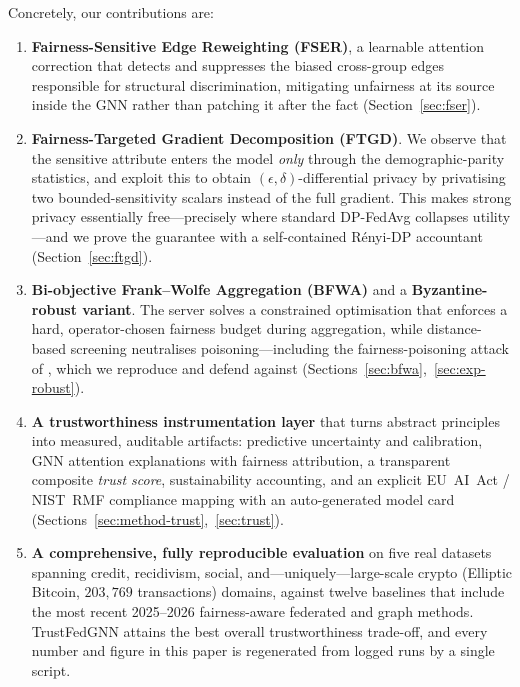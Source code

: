 \medskip
\noindent Concretely, our contributions are:
\begin{enumerate}
\item \textbf{Fairness-Sensitive Edge Reweighting (FSER)}, a learnable attention
correction that detects and suppresses the biased cross-group edges responsible
for structural discrimination, mitigating unfairness at its source inside the
GNN rather than patching it after the fact (Section~\ref{sec:fser}).

\item \textbf{Fairness-Targeted Gradient Decomposition (FTGD)}. We observe that
the sensitive attribute enters the model \emph{only} through the
demographic-parity statistics, and exploit this to obtain
$(\epsilon,\delta)$-differential privacy by privatising two bounded-sensitivity
scalars instead of the full gradient. This makes strong privacy essentially
free---precisely where standard DP-FedAvg collapses utility---and we prove the
guarantee with a self-contained R\'enyi-DP accountant (Section~\ref{sec:ftgd}).

\item \textbf{Bi-objective Frank--Wolfe Aggregation (BFWA)} and a
\textbf{Byzantine-robust variant}. The server solves a constrained optimisation
that enforces a hard, operator-chosen fairness budget during aggregation, while
distance-based screening neutralises poisoning---including the
fairness-poisoning attack of \cite{kasyap2025attack}, which we reproduce and
defend against (Sections~\ref{sec:bfwa},~\ref{sec:exp-robust}).

\item \textbf{A trustworthiness instrumentation layer} that turns abstract
principles into measured, auditable artifacts: predictive uncertainty and
calibration, GNN attention explanations with fairness attribution, a transparent
composite \emph{trust score}, sustainability accounting, and an explicit
EU~AI~Act / NIST~RMF compliance mapping with an auto-generated model card
(Sections~\ref{sec:method-trust},~\ref{sec:trust}).

\item \textbf{A comprehensive, fully reproducible evaluation} on five real
datasets spanning credit, recidivism, social, and---uniquely---large-scale
crypto (Elliptic Bitcoin, $203{,}769$ transactions) domains, against twelve
baselines that include the most recent 2025--2026 fairness-aware federated and
graph methods. TrustFedGNN attains the best overall trustworthiness trade-off,
and every number and figure in this paper is regenerated from logged runs by a
single script.
\end{enumerate}

